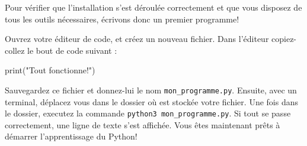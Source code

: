 Pour vérifier que l'installation s'est déroulée correctement et que vous disposez de tous les outils nécessaires, écrivons donc un premier programme!

Ouvrez votre éditeur de code, et créez un nouveau fichier. Dans l'éditeur copiez-collez le bout de code suivant :

\begin{python}
print("Tout fonctionne!")
\end{python}

Sauvegardez ce fichier et donnez-lui le nom \texttt{mon\_programme.py}. Ensuite, avec un terminal, déplacez vous dans le dossier où est stockée votre fichier. Une fois dans le dossier, executez la commande \texttt{python3 mon\_programme.py}. Si tout se passe correctement, une ligne de texte s'est affichée. Vous êtes maintenant prêts à démarrer l'apprentissage du Python!
